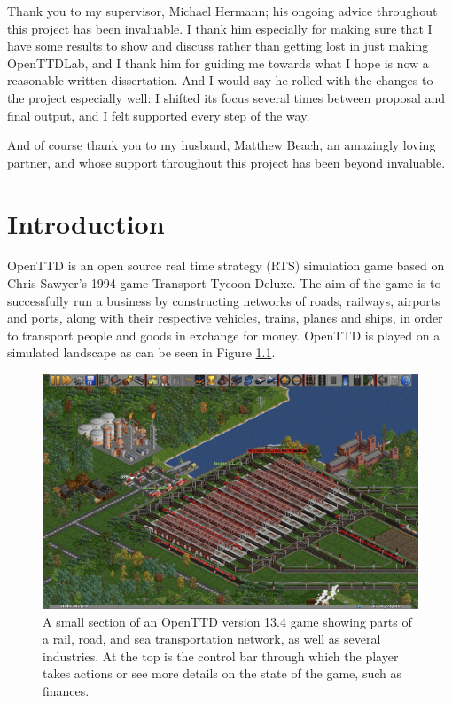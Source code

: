 \documentclass[logo,msc,dsti]{style/infthesis}    %
\begin{document}
\begin{preliminary}
\begin{acknowledgements}
Thank you to my supervisor, Michael Hermann; his ongoing advice throughout this project has been invaluable. I thank him especially for making sure that I have some results to show and discuss rather than getting lost in just making OpenTTDLab, and I thank him for guiding me towards what I hope is now a reasonable written dissertation. And I would say he rolled with the changes to the project especially well: I shifted its focus several times between proposal and final output, and I felt supported every step of the way.

And of course thank you to my husband, Matthew Beach, an amazingly loving partner, and whose support throughout this project has been beyond invaluable.

\end{acknowledgements}

\tableofcontents

\end{preliminary}


\chapter{Introduction}
\label{chapter:introduction}

OpenTTD \cite{openttd} is an open source real time strategy (RTS) simulation game based on  Chris Sawyer's 1994 game Transport Tycoon Deluxe. The aim of the game is to successfully run a business by constructing networks of roads, railways, airports and ports, along with their respective vehicles, trains, planes and ships, in order to transport people and goods in exchange for money. OpenTTD is played on a simulated landscape as can be seen in Figure \ref{figure:introduction-screenshot}.

\begin{figure}[ht]
\centering
\includegraphics[width=\columnwidth]{assets/openttd_screenshot.png}
\caption{A small section of an OpenTTD version 13.4 game showing parts of a rail, road, and sea transportation network, as well as several industries. At the top is the control bar through which the player takes actions or see more details on the state of the game, such as finances.}
\label{figure:introduction-screenshot}
\end{figure}
\end{document}
